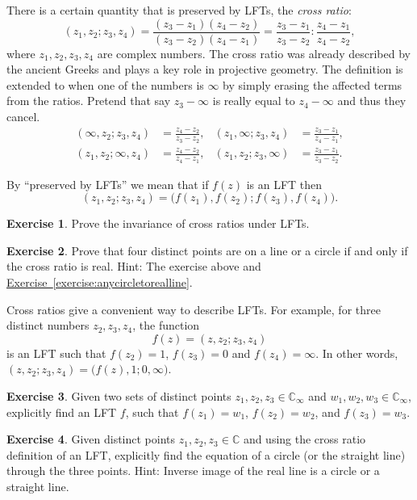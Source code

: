 \documentclass[12pt,openany]{book}
\newcommand{\C}{{\mathbb{C}}}
\newcommand{\myindex}[1]{#1\index{#1}}
\theoremstyle{plain}
\theoremstyle{remark}
\theoremstyle{definition}
\newenvironment{exbox}{%
    \def\FrameCommand{\vrule width 1pt \relax\hspace{10pt}}%
    \MakeFramed{\advance\hsize-\width\FrameRestore}%
}{%
    \endMakeFramed
}
\theoremstyle{exercise}
\newtheorem{exercise}{Exercise}[section]
\theoremstyle{example}
\newcommand{\exerciseref}[1]{\hyperref[#1]{Exercise~\ref*{#1}}}
\begin{document}
There is a certain quantity that is preserved by LFTs, the
\emph{\myindex{cross ratio}}:
\begin{equation*}
(z_1,z_2;z_3,z_4)
=
\frac{(z_3-z_1)(z_4-z_2)}{(z_3-z_2)(z_4-z_1)}
=
\frac{z_3-z_1}{z_3-z_2} : 
\frac{z_4-z_1}{z_4-z_2} ,
\end{equation*}
where $z_1,z_2,z_3,z_4$ are complex numbers.  The cross ratio
was already described by the ancient Greeks and plays a key role in
projective geometry.
The definition is extended to when one of the numbers is $\infty$ by simply
erasing the affected terms from the ratios.  Pretend that say $z_3-\infty$
is really equal to $z_4-\infty$ and thus they cancel.
\begin{align*}
(\infty,z_2;z_3,z_4)
& =
\frac{z_4-z_2}{z_3-z_2}
,
&
(z_1,\infty;z_3,z_4)
& =
\frac{z_3-z_1}{z_4-z_1}
,
\\
(z_1,z_2;\infty,z_4)
& =
\frac{z_4-z_2}{z_4-z_1}
,
& 
(z_1,z_2;z_3,\infty)
& =
\frac{z_3-z_1}{z_3-z_2} .
\end{align*}

By ``preserved by LFTs'' we mean that if $f(z)$ is an LFT then
\begin{equation*}
(z_1,z_2;z_3,z_4) =
\bigl(f(z_1),f(z_2);f(z_3),f(z_4)\bigr) .
\end{equation*}

\begin{exbox}
\begin{exercise}
Prove the invariance of cross ratios under LFTs.
\end{exercise}

\begin{exercise}
Prove that four distinct points are on a line or a circle if and only if the cross
ratio is real.
Hint: The exercise above and \exerciseref{exercise:anycircletorealline}.
\end{exercise}
\end{exbox}

Cross ratios give a convenient way to describe LFTs.  For example, 
for three distinct numbers $z_2,z_3,z_4$, the
function
\begin{equation*}
f(z) =
(z,z_2;z_3,z_4)
\end{equation*}
is an LFT such that $f(z_2) = 1$, $f(z_3)=0$ and $f(z_4) = \infty$.
In other words,
$(z,z_2;z_3,z_4) = 
\bigl(f(z),1;0,\infty\bigr)$.

\begin{exbox}
\begin{exercise}
Given two sets of distinct points $z_1,z_2,z_3 \in \C_\infty$
and $w_1,w_2,w_3 \in \C_\infty$, explicitly find an LFT $f$,
such that
$f(z_1) = w_1$,
$f(z_2) = w_2$, and
$f(z_3) = w_3$.
\end{exercise}

\begin{exercise}
Given distinct points $z_1,z_2,z_3 \in \C$ and
using the cross ratio definition of an LFT, explicitly find
the equation of a circle (or the straight line) through the three points.
Hint: Inverse image of the real line is a circle or a straight line.
\end{exercise}
\end{exbox}
\end{document}
